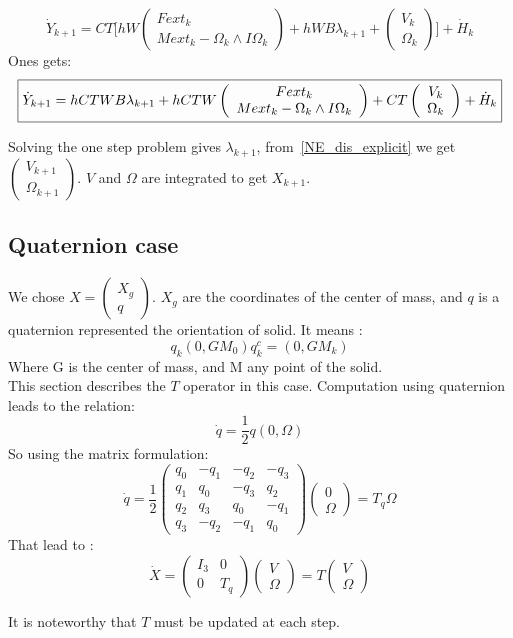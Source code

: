 \[\dot Y _{k+1}= C T \lbrack hW\left(\begin{array}{c} Fext_k\\ Mext_k - \Omega _k \wedge I\Omega _k \end{array}\right)+
   hWB \lambda _{k+1}+
   \left(\begin{array}{c} V_{k} \\ \Omega _{k}\end{array}\right) \rbrack
   + \dot H _{k} \]
Ones gets:
\[\fbox{$
\dot Y _{k+1}= hC T W B \lambda _{k+1} +hCTW \left(\begin{array}{c} Fext_k\\ Mext_k - \Omega _k
   \wedge I\Omega _k \end{array}\right) + CT \left(\begin{array}{c} V_{k} \\ \Omega
   _{k}\end{array}\right) +\dot H _{k} $}\]


Solving the one step problem gives $\lambda _{k+1}$, from~\ref{NE_dis_explicit} we get
$ \left(\begin{array}{l} V_{k+1} \\ \Omega _{k+1} \end{array}\right) $. $V$ and $\Omega$ are integrated
to get $X_{k+1}$.

\subsection{Quaternion case}
We chose $X= \left(\begin{array}{l} X_g \\q \end{array}\right) $. $X_g$ are the coordinates of the center of mass, and $q$ is a quaternion
  represented the orientation of solid. It means :
  \[q_k(0,GM_0)q_k^c = (0,GM_k)\]
Where G is the center of mass, and M any point of the solid.\\
This section describes the $T$ operator in this case. Computation using quaternion leads to the relation:
\[\dot q = \frac{1}{2} q (0,\Omega)\]
So using the matrix formulation:
\[\dot q = \frac{1}{2}  \left(\begin{array}{cccc} q_0&-q_1&-q_2&-q_3 \\ q_1&q_0&-q_3&q_2\\
  q_2&q_3&q_0&-q_1\\ q_3&-q_2&-q_1&q_0\end{array}\right)  \left(\begin{array}{c} 0 \\ \Omega
  \end{array}\right) =
  T_q   \Omega  \]
  That lead to :
  \[ \dot X = \left(\begin{array}{cc} I_3 & 0 \\ 0 &
  T_q \end{array}\right) \left(\begin{array}{c} V\\ \Omega  \end{array}\right)  = T \left(\begin{array}{c} V\\ \Omega  \end{array}\right)\]

It is noteworthy that $T$ must be updated at each step. 
